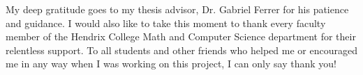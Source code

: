 \begin{acknowledgements}
My deep gratitude goes to my thesis advisor, Dr. Gabriel Ferrer for his patience and guidance. I would also like to take this moment to thank every faculty member of the Hendrix College Math and Computer Science department for their relentless support. To all students and other friends who helped me or encouraged me in any way when I was working on this project, I can only say thank you!    
\end{acknowledgements}